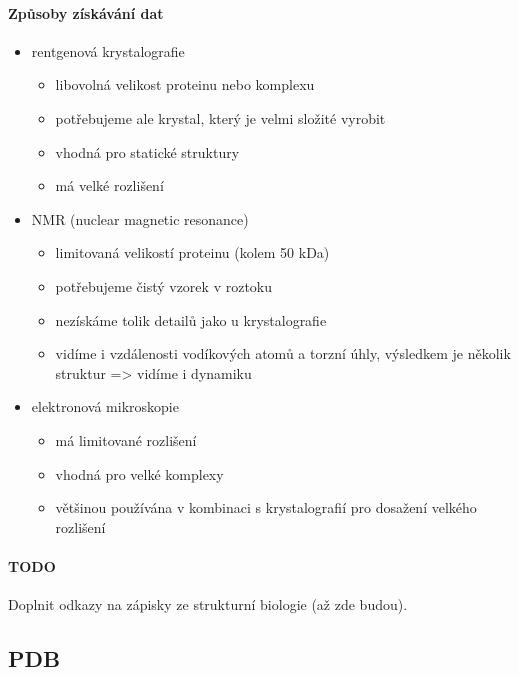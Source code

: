 \documentclass[DIV=8]{scrreprt}
\newcommand{\mybox}[2]{
    \paragraph{#1} #2
}
\begin{document}
\paragraph{Způsoby získávání dat}
\begin{itemize}[nosep]
    \item rentgenová krystalografie
\begin{itemize}[nosep]
    \item libovolná velikost proteinu nebo komplexu
    \item potřebujeme ale krystal, který je velmi složité vyrobit
    \item vhodná pro statické struktury
    \item má velké rozlišení
\end{itemize}

    \item NMR (nuclear magnetic resonance)
\begin{itemize}[nosep]
    \item limitovaná velikostí proteinu (kolem 50 kDa)
    \item potřebujeme čistý vzorek v roztoku
    \item nezískáme tolik detailů jako u krystalografie
    \item vidíme i vzdálenosti vodíkových atomů a torzní úhly, výsledkem je několik struktur => vidíme i dynamiku
\end{itemize}

    \item elektronová mikroskopie
\begin{itemize}[nosep]
    \item má limitované rozlišení
    \item vhodná pro velké komplexy
    \item většinou používána v kombinaci s krystalografií pro dosažení velkého rozlišení
\end{itemize}

\end{itemize}



\mybox{TODO}{Doplnit odkazy na zápisky ze strukturní biologie (až zde budou).}


\subsection{PDB} \label{PDB}
\end{document}
